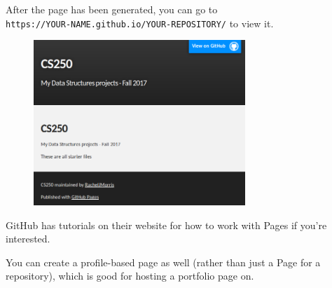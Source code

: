 \documentclass[a4paper,12pt,oneside]{book}
\begin{document}
        After the page has been generated, you can go to \\
            \texttt{https://YOUR-NAME.github.io/YOUR-REPOSITORY/}
        to view it.

        \begin{figure}[h]
            \centering
            \includegraphics[width=8cm]{images/github-pages3.png}
        \end{figure}

        GitHub has tutorials on their website for how to work with Pages
        if you're interested.

        You can create a profile-based page as well (rather than just a
        Page for a repository), which is good for hosting a portfolio page on.

        
\end{document}
